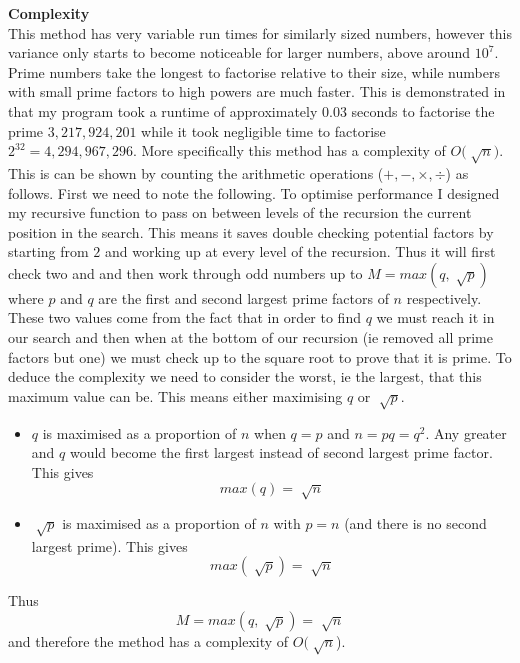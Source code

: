 \documentclass[a4paper]{article}
\begin{document}
\textbf{Complexity} \\
This method has very variable run times for similarly sized numbers, however this variance only starts to become noticeable for larger numbers, above around $10^7$. Prime numbers take the longest to factorise relative to their size, while numbers with small prime factors to high powers are much faster. This is demonstrated in that my program took a runtime of approximately 0.03 seconds to factorise the prime $3,217,924,201$ while it took negligible time to factorise $2^{32} = 4,294,967,296$. More specifically this method has a complexity of $O\big(\sqrt[]{n}\big)$. This is can be shown by counting the arithmetic operations ($+,-,\times,\div$) as follows.
\bigbreak
First we need to note the following. To optimise performance I designed my recursive function to pass on between levels of the recursion the current position in the search. This means it saves double checking potential factors by starting from $2$ and working up at every level of the recursion. Thus it will first check two and and then work through odd numbers up to $M = max(q,\sqrt[]{p})$ where $p$ and $q$ are the first and second largest prime factors of $n$ respectively. These two values come from the fact that in order to find $q$ we must reach it in our search and then when at the bottom of our recursion (ie removed all prime factors but one) we must check up to the square root to prove that it is prime.
\bigbreak
To deduce the complexity we need to consider the worst, ie the largest, that this maximum value can be. This means either maximising $q$ or $\sqrt[]{p}$. 
\begin{itemize}
\item $q$ is maximised as a proportion of $n$ when $q=p$ and $n=pq=q^2$. Any 		greater and $q$ would become the first largest instead of second largest 		prime factor. This gives
	\[ max(q) = \sqrt[]{n} \]
\item $\sqrt[]{p}$ is maximised as a proportion of $n$ with $p=n$ (and there is no  	second largest prime). This gives
	\[ max(\sqrt[]{p}) = \sqrt[]{n} \]
\end{itemize}

Thus
\[ M = max(q,\sqrt[]{p}) = \sqrt[]{n} \]
and therefore the method has a complexity of $O(\sqrt[]{n}$).
\end{document}
